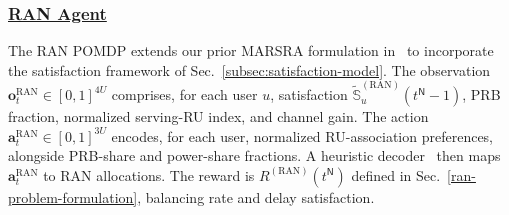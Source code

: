 \documentclass[12pt,lettersize,journal,onecolumn]{IEEEtran}
\begin{document}
\subsubsection{\underline{RAN Agent}} \label{subsubsec:pomdp-ran} %
The RAN POMDP extends our prior MARSRA formulation in~\cite[Sec.~III-A]{camad24ebrahimi} to incorporate the satisfaction framework of Sec.~\ref{subsec:satisfaction-model}. The observation $\mathbf{o}^{\text{RAN}}_t \in [0,1]^{4U}$ comprises, for each user $u$, satisfaction $\tilde{\mathbb{S}}^{\mathrm{(RAN)}}_{u}(t^{\mathsf{N}}-1)$, PRB fraction, normalized serving-RU index, and channel gain. The action $\mathbf{a}^{\text{RAN}}_t \in [0,1]^{3U}$ encodes, for each user, normalized RU-association preferences, alongside PRB-share and power-share fractions. A heuristic decoder~\cite[Sec.~III-B]{camad24ebrahimi} then maps $\mathbf{a}^{\text{RAN}}_t$ to RAN allocations. The reward is $R^{\mathrm{(RAN)}}(t^\mathsf{N})$ defined in Sec.~\ref{ran-problem-formulation}, balancing rate and delay satisfaction. %
\end{document}
